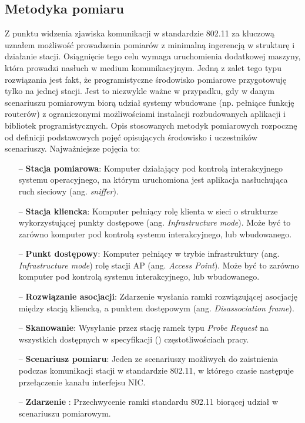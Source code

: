 \subsection{Metodyka pomiaru}
Z punktu widzenia zjawiska komunikacji w standardzie 802.11 za kluczową uznałem możliwość prowadzenia pomiarów z minimalną ingerencją w strukturę i działanie stacji. Osiągnięcie tego celu wymaga uruchomienia dodatkowej maszyny, która prowadzi nasłuch w medium komunikacyjnym. Jedną z zalet tego typu rozwiązania jest fakt, że programistyczne środowisko pomiarowe przygotowuję tylko na jednej stacji. Jest to niezwykle ważne w przypadku, gdy w danym scenariuszu pomiarowym biorą udział systemy wbudowane (np. pełniące funkcję routerów) z ograniczonymi możliwościami instalacji rozbudowanych aplikacji i bibliotek programistycznych. 
Opis stosowanych metodyk pomiarowych rozpocznę od definicji podstawowych pojęć opisujących środowisko i uczestników scenariuszy. Najważniejsze pojęcia to:
\begin{itemize}
\item[--] {\bf Stacja pomiarowa}: Komputer działający pod kontrolą interakcyjnego systemu operacyjnego, na którym uruchomiona jest aplikacja nasłuchująca ruch sieciowy (ang. \emph{sniffer}).
\item[--] {\bf Stacja kliencka}: Komputer pełniący rolę klienta w sieci o strukturze wykorzystującej punkty dostępowe (ang. \emph{Infrastructure mode}). Może być to zarówno komputer pod kontrolą systemu interakcyjnego, lub wbudowanego.
\item[--] {\bf Punkt dostępowy}: Komputer pełniący w trybie infrastruktury (ang. \emph{Infrastructure mode}) rolę stacji AP (ang. \emph{Access Point}). Może być to zarówno komputer pod kontrolą systemu interakcyjnego, lub wbudowanego.
\item[--] {\bf Rozwiązanie asocjacji}: Zdarzenie wysłania ramki rozwiązującej asocjację między stacją kliencką, a punktem dostępowym (ang. \emph{Disassociation frame}).
\item[--] {\bf Skanowanie}: Wysyłanie przez stację ramek typu \emph{Probe Request} na wszystkich dostępnych w specyfikacji (\cite{std:IEEE80211}) częstotliwościach pracy.
\item[--] {\bf Scenariusz pomiaru}: Jeden ze scenariuszy możliwych do zaistnienia podczas komunikacji stacji w standardzie 802.11, w którego czasie następuje przełączenie kanału interfejsu NIC.
\item[--] {\bf Zdarzenie }: Przechwycenie ramki standardu 802.11 biorącej udział w scenariuszu pomiarowym. 
\end{itemize}

